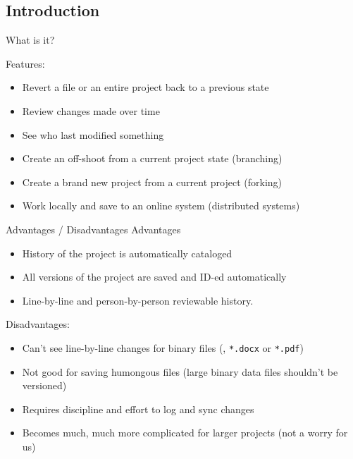 \documentclass[10pt,t,xcolor=table]{UWMadBeamer}
\newenvironment{Itemize}
    {\begin{itemize}\setlength{\itemsep}{0.50em}\setlength{\leftmargin}{0.0em}\setlength{\labelwidth}{0em}}
    {\end{itemize}}
\begin{document}
    \subsection{Introduction}
    \begin{frame}{What is it?}
        
        Features:
        \begin{Itemize}
            \item{Revert a file or an entire project back to a previous state}
            \item{Review changes made over time}
            \item{See who last modified something}
            \item{Create an off-shoot from a current project state (branching)}
            \item{Create a brand new project from a current project (forking)}
            \item{Work locally and save to an online system (distributed systems)}
        \end{Itemize}
    \end{frame}

    \begin{frame}{Advantages / Disadvantages}
        Advantages
        \begin{Itemize}
            \item{History of the project is automatically cataloged}
            \item{All versions of the project are saved and ID-ed automatically}
            \item{Line-by-line and person-by-person reviewable history.}
        \end{Itemize}
        
        Disadvantages:
        \begin{Itemize}
            \item{Can't see line-by-line changes for binary files (\eg{}, \texttt{*.docx} or \texttt{*.pdf})}
            \item{Not good for saving humongous files (large binary data files shouldn't be versioned)}
            \item{Requires discipline and effort to log and sync changes}
            \item{Becomes much, much more complicated for larger projects (not a worry for us)}
        \end{Itemize}
    \end{frame}
\end{document}
